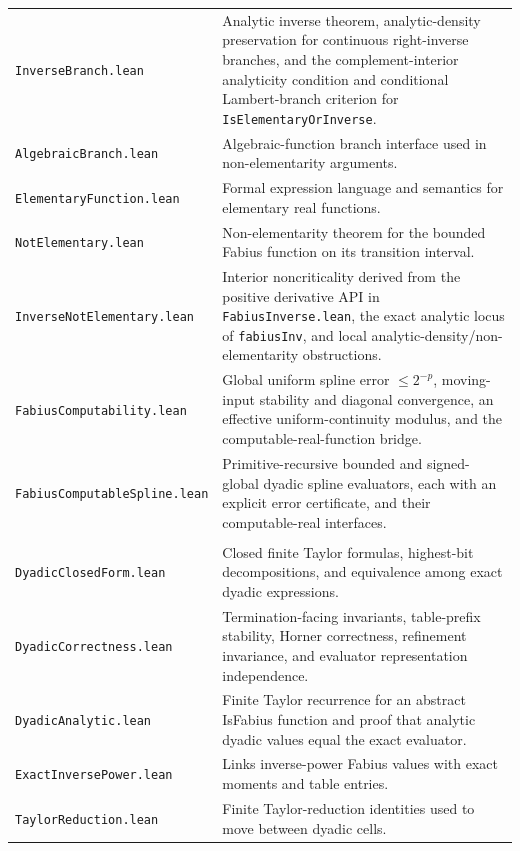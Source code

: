 \documentclass[11pt,oneside]{article}
\theoremstyle{definition}
\theoremstyle{remark}
\begin{document}
\begin{longtable}{>{\raggedright\arraybackslash}p{} >{\raggedright\arraybackslash}p{}}
\nolinkurl{InverseBranch.lean} & Analytic inverse theorem, analytic-density preservation for continuous right-inverse branches, and the complement-interior analyticity condition and conditional Lambert-branch criterion for \nolinkurl{IsElementaryOrInverse}. \\
\nolinkurl{AlgebraicBranch.lean} & Algebraic-function branch interface used in non-elementarity arguments. \\
\nolinkurl{ElementaryFunction.lean} & Formal expression language and semantics for elementary real functions. \\
\nolinkurl{NotElementary.lean} & Non-elementarity theorem for the bounded Fabius function on its transition interval. \\
\nolinkurl{InverseNotElementary.lean} & Interior noncriticality derived from the positive derivative API in \nolinkurl{FabiusInverse.lean}, the exact analytic locus of \nolinkurl{fabiusInv}, and local analytic-density/non-elementarity obstructions. \\
\nolinkurl{FabiusComputability.lean} & Global uniform spline error \(\leq2^{-p}\), moving-input stability and diagonal convergence, an effective uniform-continuity modulus, and the computable-real-function bridge. \\
\nolinkurl{FabiusComputableSpline.lean} & Primitive-recursive bounded and signed-global dyadic spline evaluators, each with an explicit error certificate, and their computable-real interfaces. \\
\addlinespace[0.45em]
\multicolumn{2}{l}{\textbf{Dyadic formulas and verified computation}}\\[0.25em]
\nolinkurl{DyadicClosedForm.lean} & Closed finite Taylor formulas, highest-bit decompositions, and equivalence among exact dyadic expressions. \\
\nolinkurl{DyadicCorrectness.lean} & Termination-facing invariants, table-prefix stability, Horner correctness, refinement invariance, and evaluator representation independence. \\
\nolinkurl{DyadicAnalytic.lean} & Finite Taylor recurrence for an abstract IsFabius function and proof that analytic dyadic values equal the exact evaluator. \\
\nolinkurl{ExactInversePower.lean} & Links inverse-power Fabius values with exact moments and table entries. \\
\nolinkurl{TaylorReduction.lean} & Finite Taylor-reduction identities used to move between dyadic cells. \\

\end{longtable}
\end{document}
